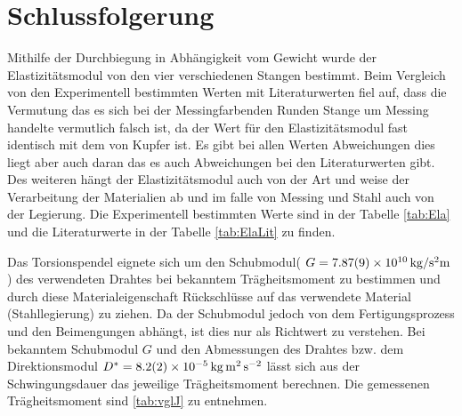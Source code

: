 
\section{Schlussfolgerung}
Mithilfe der Durchbiegung in Abhängigkeit vom Gewicht wurde der Elastizitätsmodul von den vier verschiedenen Stangen bestimmt.
Beim Vergleich von den Experimentell bestimmten Werten mit Literaturwerten fiel auf, dass die Vermutung das es sich bei der Messingfarbenden Runden Stange um Messing handelte vermutlich falsch ist, da der Wert für den Elastizitätsmodul fast identisch mit dem von Kupfer ist. 
Es gibt bei allen Werten Abweichungen dies liegt aber auch daran das es auch Abweichungen bei den Literaturwerten gibt. Des weiteren hängt der Elastizitätsmodul auch von der Art und weise der Verarbeitung der Materialien ab und im falle von Messing und Stahl auch von der Legierung.
Die Experimentell bestimmten Werte sind in der Tabelle \ref{tab:Ela} und die Literaturwerte in der Tabelle \ref{tab:ElaLit} zu finden.

Das Torsionspendel eignete sich um den Schubmodul( $G =\SI{7.87+-0.09e10}{kg \per \second \squared  \metre}$) des verwendeten Drahtes bei bekanntem Trägheitsmoment zu bestimmen und durch diese Materialeigenschaft Rückschlüsse auf das verwendete Material (Stahllegierung) zu ziehen. Da der Schubmodul jedoch von dem Fertigungsprozess und den Beimengungen abhängt, ist dies nur als Richtwert zu verstehen. Bei bekanntem Schubmodul $G$ und den Abmessungen des Drahtes bzw. dem Direktionsmodul $D^*=\SI{8.2+-0.2e-5}{\kilogram \metre \squared \per \second \squared }$  lässt sich aus der Schwingungsdauer das jeweilige Trägheitsmoment berechnen.  Die gemessenen  Trägheitsmoment  sind \cref{tab:vglJ} zu entnehmen.








